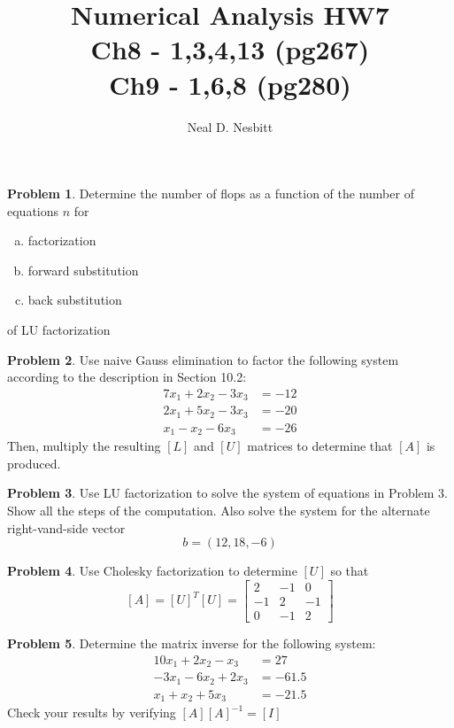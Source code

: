 \documentclass{article}
\title{Numerical Analysis HW7\\
Ch8 - 1,3,4,13 (pg267)\\
Ch9 - 1,6,8 (pg280)\\}
\author{Neal D. Nesbitt}
\begin{document}
\maketitle

\theoremstyle{definition}
\newtheorem{problem}{Problem}


\begin{problem}
Determine the number of flops as a function of the number of equations $n$ for
\begin{enumerate}[(a)]
\item factorization
\item forward substitution
\item back substitution
\end{enumerate}
of LU factorization
\end{problem}

\setcounter{problem}{2}
\begin{problem}
Use naive Gauss elimination to factor the following system according to the description in Section 10.2:
\begin{align*}
7x_{1} + 2x_{2} - 3x_{3} &= -12 \\
2x_{1} + 5x_{2} - 3x_{3} &= -20 \\
x_{1} - x_{2} - 6x_{3} &= -26
\end{align*}
Then, multiply the resulting $[L]$ and $[U]$ matrices to determine that $[A]$ is produced.
\end{problem}

\begin{problem}
Use LU factorization to solve the system of equations in Problem 3. Show all the steps of the computation. Also solve the system for the alternate right-vand-side vector
\[ b = (12,18,-6) \]
\end{problem}

\setcounter{problem}{12}
\begin{problem}
Use Cholesky factorization to determine $[U]$ so that
\[ [A] = [U]^{T}[U] =
\begin{bmatrix}
2	&	-1	&	0	\\
-1	&	2	&	-1	\\
0	&	-1	&	2
\end{bmatrix} \]
\end{problem}

\setcounter{problem}{0}
\begin{problem}
Determine the matrix inverse for the following system:
\begin{align*}
10x_{1}	+	2x_{2}	-	x_{3}	&=	27		\\
-3x_{1}	-	6x_{2}	+	2x_{3}	&=	-61.5	\\
x_{1}	+	x_{2}	+	5x_{3}	&=	-21.5
\end{align*}
Check your results by verifying $[A][A]^{-1} = [I]$
\end{problem}
\end{document}
